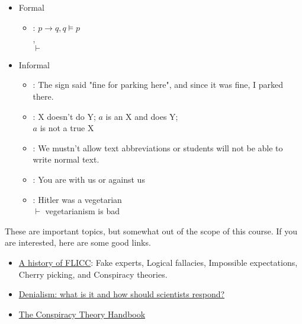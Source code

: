 \documentclass[headrule,footrule]{foils}
\begin{document}
\begin{itemize}
\item Formal
  \begin{itemize}
  \item {}: $p \rightarrow q, q \models p$
    \\ , 
    \\ $\vdash$ 
  \end{itemize}
\item Informal
  \begin{itemize}
  \item {}:  The sign said "fine for parking here", and since it was fine, I parked there. 
  \item {}: X doesn't do Y; $a$ is an X and does Y;
    \\ $a$ is not a true X
  \item {}: We mustn't allow text abbreviations or students will not be able to write normal text.
  \item {}: You are with us or against us
  \item {}: Hitler was a vegetarian \\
    $\vdash$ vegetarianism is bad
  \end{itemize}
\end{itemize}


These are important topics, but somewhat out of the scope of this
course.  If you are interested, here are some good links.

\begin{itemize}
\item
  \href{https://crankyuncle.com/a-history-of-flicc-the-5-techniques-of-science-denial/}{A
    history of FLICC}: Fake experts, Logical fallacies, Impossible expectations, Cherry picking, and Conspiracy theories.
  
\item \href{https://academic.oup.com/eurpub/article/19/1/2/463780}{Denialism: what is it and how should scientists respond?}
\item \href{https://www.climatechangecommunication.org/conspiracy-theory-handbook/}{The Conspiracy Theory Handbook}
\end{itemize}
\end{document}
